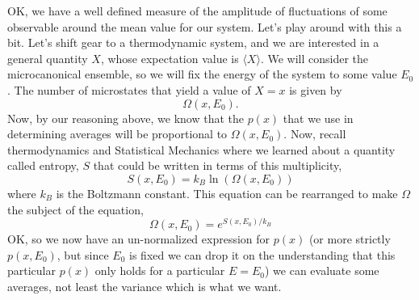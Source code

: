 \documentclass[]{revtex4}
\newcommand{\sm}[1]{{\[#1\]}}
\begin{document}
OK, we have a well defined measure of the amplitude of fluctuations of some observable around the mean value for our system.  Let's play around with this
a bit.  Let's shift gear to a thermodynamic system, and we are interested in a general quantity $X$, whose expectation value is $\langle X\rangle$.  We will
consider the microcanonical ensemble, so we will fix the energy of the system to some value $E_0$.  The number of microstates that yield a value of $X=x$ is
given by
\sm{\Omega(x,E_0).}
Now, by our reasoning above, we know that the $p(x)$ that we use in determining averages will be proportional to $\Omega(x,E_0)$.  Now, recall
thermodynamics and Statistical Mechanics where we learned about a quantity called entropy, $S$ that could be written in terms of this multiplicity,
\sm{S(x,E_0) = k_B \ln (\Omega(x,E_0))}
where $k_B$ is the Boltzmann constant.  This equation can be rearranged to make $\Omega$ the subject of the equation,
\sm{\Omega(x,E_0) = e^{S(x,E_0)/k_B}}
OK, so we now have an un-normalized expression for $p(x)$ (or more strictly $p(x,E_0)$, but since $E_0$ is fixed we can drop it on the understanding that
this particular $p(x)$ only holds for a particular $E=E_0$) we can evaluate some averages, not least the variance which is what we want.
\end{document}
